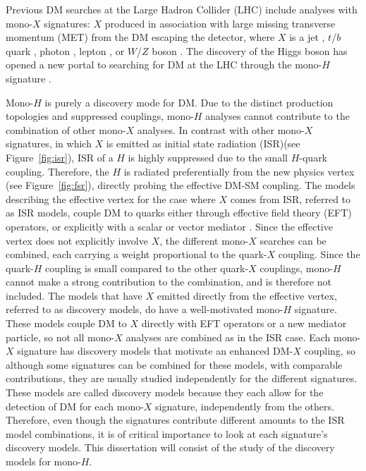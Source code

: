 Previous DM searches at the Large Hadron Collider (LHC) include analyses with mono-$X$ signatures: $X$ produced in association with large missing transverse momentum (MET) from the DM escaping the detector, where $X$ is a jet \cite{Aad:2015zva, Khachatryan:2014rra}, $t$/$b$ quark \cite{Aad:2014vea, Khachatryan:2014uma, Khachatryan:2015nua}, photon \cite{Aad:2014tda, Chatrchyan:2012tea, Khachatryan:2014rwa}, lepton \cite{Khachatryan:2014tva, ATLAS:2014wra}, or $W$/$Z$ boson \cite{Aad:2014vka, Aad:2013oja, Khachatryan:2015bbl}. The discovery of the Higgs boson has opened a new portal to searching for DM at the LHC through the mono-$H$ signature \cite{Carpenter:2013xra, Berlin:2014cfa}. 

\indent Mono-$H$ is purely a discovery mode for DM. Due to the distinct production topologies and suppressed couplings, mono-$H$ analyses cannot contribute to the combination of other mono-$X$ analyses. In contrast with other mono-$X$ signatures, in which $X$ is emitted as initial state radiation (ISR)(see Figure~\ref{fig:isr}), ISR of a $H$ is highly suppressed due to the small $H$-quark coupling. Therefore, the $H$ is radiated preferentially from the new physics vertex (see Figure~\ref{fig:fsr}), directly probing the effective DM-SM coupling. The models describing the effective vertex for the case where $X$ comes from ISR, referred to as ISR models, couple DM to quarks either through effective field theory (EFT) operators, or explicitly with a scalar or vector mediator \cite{Abercrombie:2015wmb}. Since the effective vertex does not explicitly involve $X$, the different mono-$X$ searches can be combined, each carrying a weight proportional to the quark-$X$ coupling. Since the quark-$H$ coupling is small compared to the other quark-$X$ couplings, mono-$H$ cannot make a strong contribution to the combination, and is therefore not included. The models that have $X$ emitted directly from the effective vertex, referred to as discovery models, do have a well-motivated mono-$H$ signature. These models couple DM to $X$ directly with EFT operators or a new mediator particle, so not all mono-$X$ analyses are combined as in the ISR case. Each mono-$X$ signature has discovery models that motivate an enhanced DM-$X$ coupling, so although some signatures can be combined for these models, with comparable contributions, they are usually studied independently for the different signatures. These models are called discovery models because they each allow for the detection of DM for each mono-$X$ signature, independently from the others. Therefore, even though the signatures contribute different amounts to the ISR model combinations, it is of critical importance to look at each signature's discovery models. This dissertation will consist of the study of the discovery models for mono-$H$. 

